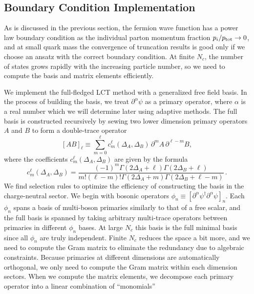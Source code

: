 \documentclass[12pt]{article}
\renewcommand{\d}{\partial}
\newcommand{\p}{\partial}
\newcommand{\fr}{\frac}
\newcommand{\Nc}{N_c}
\begin{document}
\subsection{Boundary Condition Implementation}


As is discussed in the previous section, the fermion wave function has a power law boundary condition as the individual parton momentum fraction $p_i/p_{\rm tot} \rightarrow 0$, and at small quark mass the convergence of truncation results is good only if we choose an ansatz with the correct boundary condition. At finite $\Nc$, the number of states grows rapidly with the increasing particle number, so we need to compute the basis and matrix elements efficiently.

We implement the full-fledged LCT method with a generalized free field basis. In the process of building the basis, we treat $\d^\alpha\psi$ as a primary operator, where $\alpha$ is a real number which we will determine later using adaptive methods. The full basis is constructed recursively by sewing two lower dimension primary operators $A$ and $B$ to form a double-trace operator 
\begin{equation}
\left[ AB \right]_\ell \equiv \sum_{m=0}^\ell c^\ell_m(\Delta_A,\Delta_B)\, \p^m A \, \p^{\ell-m} B,
\end{equation}
where the coefficients $c^\ell_m(\Delta_A,\Delta_B)$ are given by the formula
\begin{equation}
c^\ell_m(\Delta_A,\Delta_B) = \fr{(-1)^m \Gamma(2\Delta_A+\ell) \Gamma(2\Delta_B+\ell)}{m! (\ell-m)! \Gamma(2\Delta_A+m) \Gamma(2\Delta_B + \ell - m)}  \,.
\end{equation}
We find selection rules to optimize the efficiency of constructing the basis in the charge-neutral sector. We begin with bosonic operators $\phi_n \equiv \left[\d^\alpha\psi^\dagger \d^\alpha\psi\right]_n$. Each $\phi_n$ spans a basis of multi-boson primaries similarly to that of a free scalar, and the full basis is spanned by taking arbitrary multi-trace operators between primaries in different $\phi_n$ bases. At large $\Nc$ this basis is the full minimal basis since all $\phi_n$ are truly independent. Finite $\Nc$ reduces the space a bit more, and we need to compute the Gram matrix to eliminate the redundancy due to algebraic constraints. Because primaries at different dimensions are automatically orthogonal, we only need to compute the Gram matrix within each dimension sectors. When we compute the matrix elements, we decompose each primary operator into a linear combination of ``monomials''
\end{document}
